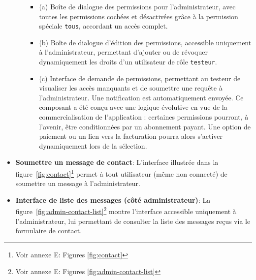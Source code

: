 \begin{itemize}[label=$\bullet$]
\begin{itemize}[label=$\diamond$, left=0.01cm]
        \begin{itemize}[label=$*$, left=0.01cm]
            \item (a) Boîte de dialogue des permissions pour l’administrateur, avec toutes les permissions cochées et désactivées grâce à la permission spéciale \texttt{tous}, accordant un accès complet.
            \item (b) Boîte de dialogue d’édition des permissions, accessible uniquement à l’administrateur, permettant d’ajouter ou de révoquer dynamiquement les droits d’un utilisateur de rôle \texttt{testeur}.
            \item (c) Interface de demande de permissions, permettant au testeur de visualiser les accès manquants et de soumettre une requête à l’administrateur. Une notification est automatiquement envoyée. Ce composant a été conçu avec une logique évolutive en vue de la commercialisation de l’application : certaines permissions pourront, à l’avenir, être conditionnées par un abonnement payant. Une option de paiement ou un lien vers la facturation pourra alors s’activer dynamiquement lors de la sélection.
    \end{itemize}
\end{itemize}
\item \textbf{Soumettre un message de contact}:
        L’interface illustrée dans la figure~\ref{fig:contact}\footnote{Voir annexe E: Figures \ref{fig:contact}} permet à tout utilisateur (même non connecté) de soumettre un message à l’administrateur.
    \item \textbf{Interface de liste des messages (côté administrateur)}:
        La figure~\ref{fig:admin-contact-list}\footnote{Voir annexe E: Figures \ref{fig:admin-contact-list}} montre l’interface accessible uniquement à l’administrateur, lui permettant de consulter la liste des messages reçus via le formulaire de contact.
\end{itemize}